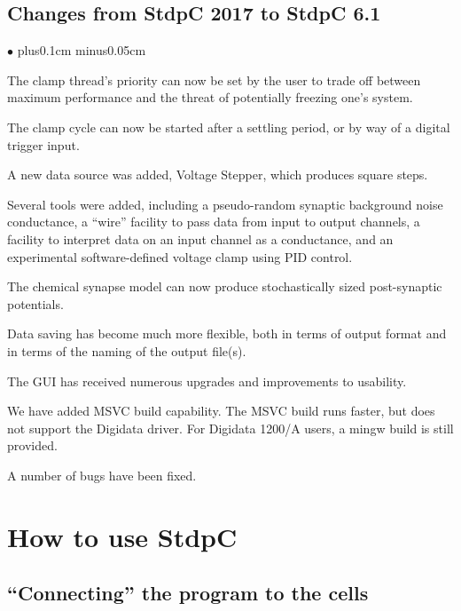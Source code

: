 \documentclass{article}
\newenvironment{myitem}{\begin{list}{$\bullet$}{\setlength{\leftmargin}{1.1em}
\itemsep0.1cm plus0.1cm minus0.05cm
\listparindent0cm
\addtolength{\labelsep}{0.5\labelsep}
\setlength{\labelwidth}{0.8em}
\setlength{\leftmargin}{\labelwidth}
\addtolength{\leftmargin}{\labelsep}
}}{\end{list}}
\begin{document}
\subsection{Changes from StdpC 2017 to StdpC 6.1}
\begin{myitem}
\item The clamp thread's priority can now be set by the user to trade off between maximum performance
and the threat of potentially freezing one's system.
\item The clamp cycle can now be started after a settling period, or by way of a digital trigger input.
\item A new data source was added, Voltage Stepper, which produces square steps.
\item Several tools were added, including a pseudo-random synaptic background noise conductance, a
``wire'' facility to pass data from input to output channels, a facility to interpret data on an input
channel as a conductance, and an experimental software-defined voltage clamp using PID control.
\item The chemical synapse model can now produce stochastically sized post-synaptic potentials.
\item Data saving has become much more flexible, both in terms of output format and in terms of the naming
of the output file(s).
\item The GUI has received numerous upgrades and improvements to usability.
\item We have added MSVC build capability. The MSVC build runs faster, but does not support the Digidata
driver. For Digidata 1200/A users, a mingw build is still provided.
\item A number of bugs have been fixed.
\end{myitem}

\section{How to use StdpC}

\subsection{``Connecting'' the program to the cells}
 
\end{document}
